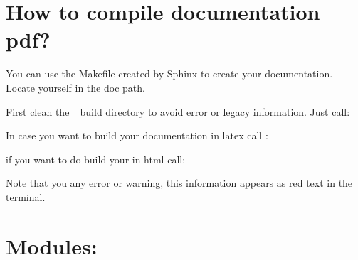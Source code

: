 \documentclass[a4paper,11pt,english]{sphinxmanual}
\begin{document}
\begin{sphinxVerbatim}[commandchars=\\\{\}]
       
\end{sphinxVerbatim}


\chapter{How to compile documentation pdf?}
\label{\detokenize{index:how-to-compile-documentation-pdf}}
You can use the Makefile created by Sphinx to create your documentation. Locate yourself in the doc path.

First clean the \_build directory to avoid error or legacy information. Just call:

\begin{sphinxVerbatim}[commandchars=\\\{\}]
 
\end{sphinxVerbatim}

In case you want to build your documentation in latex call :

\begin{sphinxVerbatim}[commandchars=\\\{\}]
 
\end{sphinxVerbatim}

if you want to do build your in html call:

\begin{sphinxVerbatim}[commandchars=\\\{\}]
 
\end{sphinxVerbatim}

Note that you  any error or warning, this information appears as red text in the terminal.


\chapter{Modules:}
\label{\detokenize{index:modules}}
\end{document}
